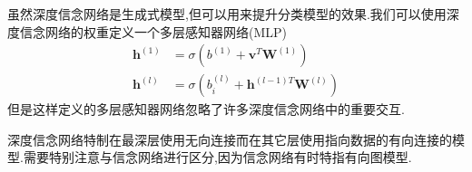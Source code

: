虽然深度信念网络是生成式模型,但可以用来提升分类模型的效果.我们可以使用深度信念网络的权重定义一个多层感知器网络(MLP)
\begin{equation}\begin{split}
\bm h^{(1)}&=\sigma(b^{(1)}+\bm v^T\bm W^{(1)})\\
\bm h^{(l)}&=\sigma(b_i^{(l)}+\bm h^{(l-1)T}\bm W^{(l)})
\end{split}\end{equation}
但是这样定义的多层感知器网络忽略了许多深度信念网络中的重要交互.

深度信念网络特制在最深层使用无向连接而在其它层使用指向数据的有向连接的模型.需要特别注意与信念网络进行区分,因为信念网络有时特指有向图模型.